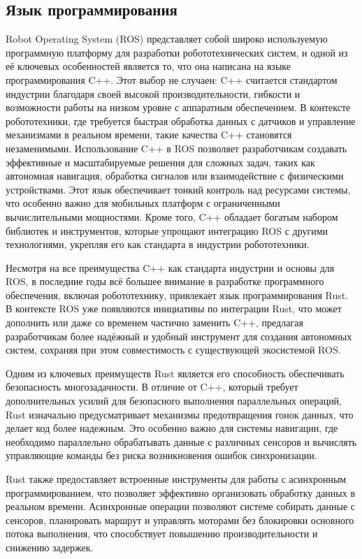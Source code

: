 \subsection{Язык программирования}
Robot Operating System (ROS) представляет собой широко используемую программную
платформу для разработки робототехнических систем, и одной из её ключевых
особенностей является то, что она написана на языке программирования C++. Этот
выбор не случаен: C++ считается стандартом индустрии благодаря своей высокой
производительности, гибкости и возможности работы на низком уровне с аппаратным
обеспечением. В контексте робототехники, где требуется быстрая обработка данных
с датчиков и управление механизмами в реальном времени, такие качества C++
становятся незаменимыми. Использование C++ в ROS позволяет разработчикам
создавать эффективные и масштабируемые решения для сложных задач, таких как
автономная навигация, обработка сигналов или взаимодействие с физическими
устройствами. Этот язык обеспечивает тонкий контроль над ресурсами системы, что
особенно важно для мобильных платформ с ограниченными вычислительными
мощностями. Кроме того, C++ обладает богатым набором библиотек и инструментов,
которые упрощают интеграцию ROS с другими технологиями, укрепляя его как
стандарта в индустрии робототехники.

Несмотря на все преимущества C++ как стандарта индустрии и основы для ROS, в
последние годы всё большее внимание в разработке программного обеспечения,
включая робототехнику, привлекает язык программирования Rust. В контексте ROS
уже появляются инициативы по интеграции Rust, что может дополнить или даже со
временем частично заменить C++, предлагая разработчикам более надёжный и удобный
инструмент для создания автономных систем, сохраняя при этом совместимость с
существующей экосистемой ROS.

Одним из ключевых преимуществ Rust является его способность обеспечивать
безопасность многозадачности. В отличие от C++, который требует дополнительных
усилий для безопасного выполнения параллельных операций, Rust изначально
предусматривает механизмы предотвращения гонок данных, что делает код более
надежным. Это особенно важно для системы навигации, где необходимо параллельно
обрабатывать данные с различных сенсоров и вычислять управляющие команды без
риска возникновения ошибок синхронизации.

Rust также предоставляет встроенные инструменты для работы с асинхронным
программированием, что позволяет эффективно организовать обработку данных в
реальном времени. Асинхронные операции позволяют системе собирать данные с
сенсоров, планировать маршрут и управлять моторами без блокировки основного
потока выполнения, что способствует повышению производительности и снижению
задержек.

